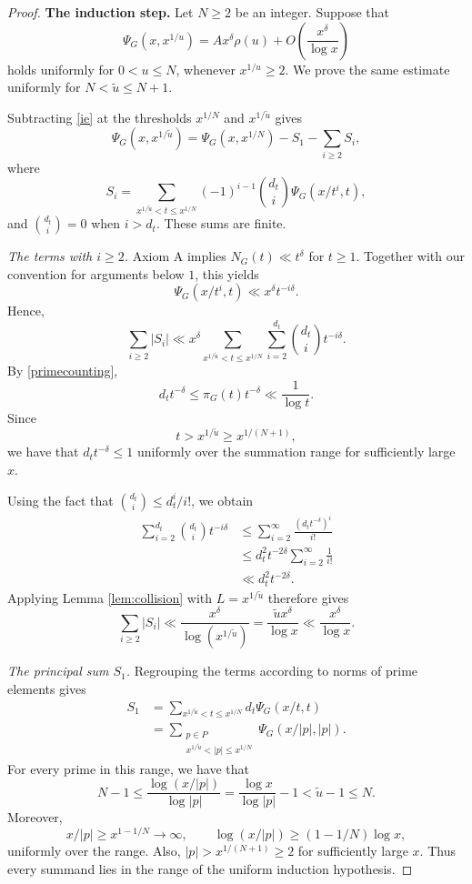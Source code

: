\documentclass[a4paper]{amsart}
\begin{document}
\begin{proof}
\smallskip
\noindent\textbf{The induction step.}
Let $N\ge2$ be an integer. Suppose that
\begin{equation}\label{ih}
\Psi_G(x,x^{1/u})
=
Ax^\delta\rho(u)
+O\!\left(\frac{x^\delta}{\log x}\right)
\end{equation}
holds uniformly for $0<u\le N$, whenever
$x^{1/u}\ge2$. We prove the same estimate uniformly for
$N<\tilde u\le N+1$.

Subtracting \eqref{ie} at the thresholds $x^{1/N}$
and $x^{1/\tilde u}$ gives
\begin{equation}\label{subtract}
\Psi_G(x,x^{1/\tilde u})
=
\Psi_G(x,x^{1/N})-S_1-\sum_{i\ge2}S_i,
\end{equation}
where
\[
S_i
=
\sum_{x^{1/\tilde u}<t\le x^{1/N}}
(-1)^{i-1}\binom{d_t}{i}\Psi_G(x/t^i,t),
\]
and $\binom{d_t}{i}=0$ when $i>d_t$.
These sums are finite.

\smallskip
\noindent\emph{The terms with $i\ge2$.}
Axiom A implies $N_G(t)\ll t^\delta$ for $t\ge1$.
Together with our convention for arguments below $1$,
this yields
\[
\Psi_G(x/t^i,t)\ll x^\delta t^{-i\delta}.
\]
Hence,
\[\sum_{i\ge2}|S_i|
\ll
x^\delta
\sum_{x^{1/\tilde u}<t\le x^{1/N}}
\sum_{i=2}^{d_t}\binom{d_t}{i}t^{-i\delta}.
\]
By \eqref{primecounting},
\[
d_tt^{-\delta}
\le\pi_G(t)t^{-\delta}
\ll\frac1{\log t}.
\]
Since
\[
t>x^{1/\tilde u}\ge x^{1/(N+1)},
\]
we have that $d_tt^{-\delta}\le1$ uniformly over the
summation range for sufficiently large $x$.

Using the fact that $\binom{d_t}{i}\le d_t^i/i!$, we obtain
\begin{align*}
\sum_{i=2}^{d_t}\binom{d_t}{i}t^{-i\delta}
&\le
\sum_{i=2}^\infty\frac{(d_tt^{-\delta})^i}{i!}\\
&\le
d_t^2t^{-2\delta}\sum_{i=2}^\infty\frac1{i!}\\
&\ll d_t^2t^{-2\delta}.
\end{align*}
Applying Lemma \ref{lem:collision} with
$L=x^{1/\tilde u}$ therefore gives
\begin{equation}\label{error}
\sum_{i\ge2}|S_i|
\ll
\frac{x^\delta}{\log(x^{1/\tilde u})}
=
\frac{\tilde u x^\delta}{\log x}
\ll\frac{x^\delta}{\log x}.
\end{equation}

\smallskip
\noindent\emph{The principal sum $S_1$.}
Regrouping the terms according to norms of prime elements gives
\begin{equation}\label{regroup}
\begin{split}
S_1
&=
\sum_{x^{1/\tilde u}<t\le x^{1/N}}
d_t\Psi_G(x/t,t)\\
&=
\sum_{\substack{p\in P\\
x^{1/\tilde u}<|p|\le x^{1/N}}}
\Psi_G(x/|p|,|p|).
\end{split}
\end{equation}
For every prime in this range, we have that
\[
N-1
\le
\frac{\log(x/|p|)}{\log|p|}
=
\frac{\log x}{\log|p|}-1
<
\tilde u-1
\le N.
\]
Moreover,
\[
x/|p|\ge x^{1-1/N}\longrightarrow\infty,
\qquad
\log(x/|p|)\ge(1-1/N)\log x,
\]
uniformly over the range. Also,
$|p|>x^{1/(N+1)}\ge2$ for sufficiently large $x$.
Thus every summand lies in the range of the uniform
induction hypothesis.


\end{proof}
\end{document}

